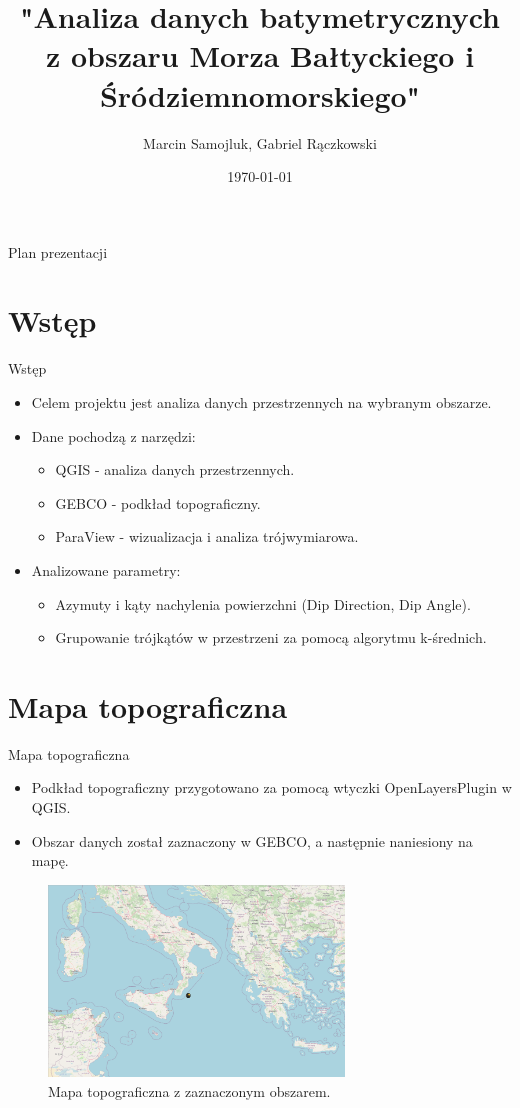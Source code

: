 \documentclass{beamer}
\title{ "Analiza danych batymetrycznych z 
	obszaru Morza Bałtyckiego i Śródziemnomorskiego" }
\author{Marcin Samojluk, Gabriel Rączkowski}
\date{\today}
\begin{document}
\frame{\titlepage}

\begin{frame}{Plan prezentacji}
    \tableofcontents
\end{frame}

\section{Wstęp}
\begin{frame}{Wstęp}
    \begin{itemize}
        \item Celem projektu jest analiza danych przestrzennych na wybranym obszarze.
        \item Dane pochodzą z narzędzi:
        \begin{itemize}
            \item QGIS - analiza danych przestrzennych.
            \item GEBCO - podkład topograficzny.
            \item ParaView - wizualizacja i analiza trójwymiarowa.
        \end{itemize}
        \item Analizowane parametry:
        \begin{itemize}
            \item Azymuty i kąty nachylenia powierzchni (Dip Direction, Dip Angle).
            \item Grupowanie trójkątów w przestrzeni za pomocą algorytmu k-średnich.
        \end{itemize}
    \end{itemize}
\end{frame}

\section{Mapa topograficzna}
\begin{frame}{Mapa topograficzna}
    \begin{itemize}
        \item Podkład topograficzny przygotowano za pomocą wtyczki OpenLayersPlugin w QGIS.
        \item Obszar danych został zaznaczony w GEBCO, a następnie naniesiony na mapę.
    \end{itemize}
    \begin{figure}
        \includegraphics[width=0.7\textwidth]{topograf.png}
        \caption{Mapa topograficzna z zaznaczonym obszarem.}
    \end{figure}
\end{frame}
\end{document}
